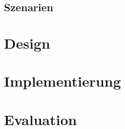 \documentclass[a4paper,10pt]{article}
\begin{document}
\subsection{Szenarien}

\section{Design}

\section{Implementierung}

\section{Evaluation}
\end{document}
